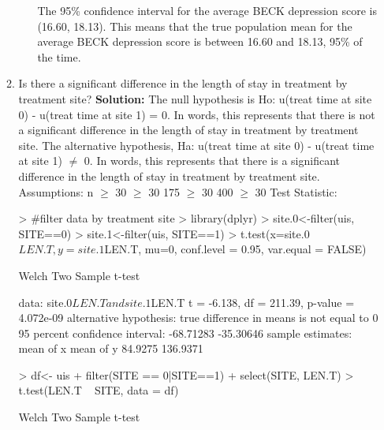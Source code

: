 \documentclass{article}
\begin{document}
\begin{enumerate}
\begin{enumerate}
\begin{enumerate}
\begin{Schunk}
\end{Schunk}
The 95\% confidence interval for the average BECK depression score is (16.60, 18.13). This means that the true population mean for the average BECK depression score is between 16.60 and 18.13, 95\% of the time. 
    \end{enumerate}
    \item Is there a significant difference in the length of stay in treatment by 
    treatment site?
    \newline
    \textbf{Solution:}
    \newline
The null hypothesis is Ho: u(treat time at site 0) - u(treat time at site 1) = 0. In words, this represents that there is not a significant difference in the length of stay in treatment by treatment site.
\newline
The alternative hypothesis, Ha: u(treat time at site 0) - u(treat time at site 1) $\neq$ 0. In words, this represents that there is a significant difference in the length of stay in treatment by treatment site. 
\newline
Assumptions:
\newline
n $\geq$ 30
 $\geq$ 30 
175 $\geq$ 30
400 $\geq$ 30
\newline
Test Statistic:
\begin{Schunk}
\begin{Sinput}
> #filter data by treatment site
> library(dplyr)
> site.0<-filter(uis, SITE==0)
> site.1<-filter(uis, SITE==1)
> t.test(x=site.0$LEN.T, y=site.1$LEN.T, mu=0, conf.level = 0.95, var.equal = FALSE)
\end{Sinput}
\begin{Soutput}
	Welch Two Sample t-test

data:  site.0$LEN.T and site.1$LEN.T
t = -6.138, df = 211.39, p-value = 4.072e-09
alternative hypothesis: true difference in means is not equal to 0
95 percent confidence interval:
 -68.71283 -35.30646
sample estimates:
mean of x mean of y 
  84.9275  136.9371 
\end{Soutput}
\begin{Sinput}
> df<- uis %
+   filter(SITE == 0|SITE==1) %
+   select(SITE, LEN.T)
> t.test(LEN.T ~ SITE, data = df)
\end{Sinput}
\begin{Soutput}
	Welch Two Sample t-test


\end{Soutput}
\end{Schunk}
\end{enumerate}
\end{enumerate}
\end{document}
